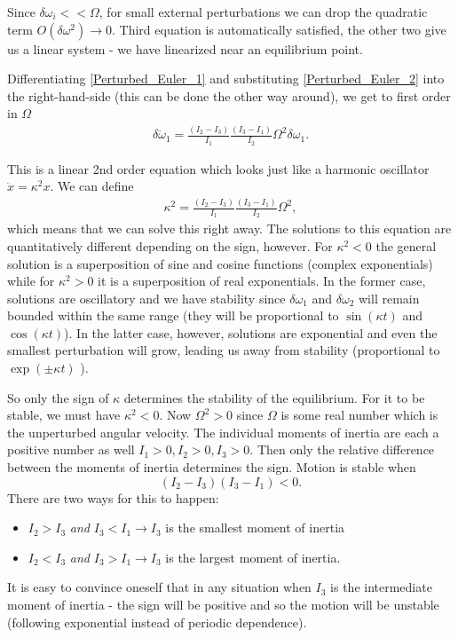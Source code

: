 \documentclass[a4paper]{article}
\begin{document}
	Since $\delta\omega_i << \Omega$, for small external perturbations we can drop the quadratic term $O(\delta\omega^2) \rightarrow 0 $.
	Third equation is automatically satisfied, the other two give us a linear system - we have linearized near an equilibrium point.

	Differentiating \eqref{Perturbed_Euler_1} and substituting \eqref{Perturbed_Euler_2} into the right-hand-side (this can be done the other way around), we get to first order in $\Omega$
	\begin{eqnarray}
		\delta\ddot{\omega}_1 = \frac{( I_2 - I_3 )}{I_1}\frac{( I_3 - I_1 )}{I_2}\Omega^2 \delta\omega_1.
	\end{eqnarray}

	This is a linear 2nd order equation which looks just like a harmonic oscillator $\ddot{x} = \kappa^2 x$.
	We can define
	\begin{eqnarray}\label{kappa_eq}
		\kappa^2 = \frac{( I_2 - I_3 )}{I_1}\frac{( I_3 - I_1 )}{I_2}\Omega^2,
	\end{eqnarray}
	which means that we can solve this right away.
	The solutions to this equation are quantitatively different depending on the sign, however.
	For $\kappa^2 < 0$ the general solution is a superposition of sine and cosine functions (complex exponentials) while for $\kappa^2 > 0$ it is a superposition of real exponentials.
	In the former case, solutions are oscillatory and we have stability since $\delta \omega_1$ and $\delta \omega_2$ will remain bounded within the same range (they will be proportional to $\sin( \kappa t )$ and $\cos( \kappa t )$).
	In the latter case, however, solutions are exponential and even the smallest perturbation will grow, leading us away from stability (proportional to $\exp( \pm \kappa t )$ ).

	So only the sign of $\kappa$ determines the stability of the equilibrium.
	For it to be stable, we must have $\kappa^2 < 0$.
	Now $\Omega^2 > 0$ since $\Omega$ is some real number which is the unperturbed angular velocity.
	The individual moments of inertia are each a positive number as well $ I_1 > 0, I_2 > 0, I_3 > 0 $.
	Then only the relative difference between the moments of inertia determines the sign.
	Motion is stable when $$ ( I_2 - I_3 )( I_3 - I_1 ) < 0. $$
	There are two ways for this to happen:
	\begin{itemize}
		\item $ I_2 > I_3 $ \textit{and} $ I_3 < I_1 \rightarrow I_3 $ is the smallest moment of inertia
		\item $ I_2 < I_3 $ \textit{and} $ I_3 > I_1 \rightarrow I_3 $ is the largest moment of inertia.
	\end{itemize}
	It is easy to convince oneself that in any situation when $I_3$ is the intermediate moment of inertia - the sign will be positive and so the motion will be unstable (following exponential instead of periodic dependence).
\end{document}
